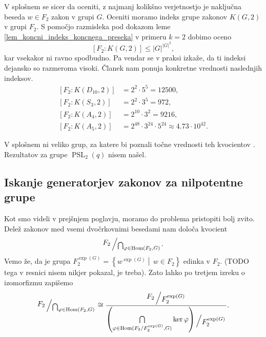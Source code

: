 V splošnem se sicer da oceniti, z najmanj kolikšno verjetnostjo je naključna beseda $w \in F_2$ zakon v grupi $G$.
Oceniti moramo indeks grupe zakonov $K(G, 2)$ v grupi $F_2$. S pomočjo razmisleka pod dokazom leme \ref{lem_koncni_indeks_koncnega_preseka} v primeru $k  = 2$ dobimo oceno
\begin{equation*}
    \left[ F_2 : K(G, 2) \right] \le {\lvert G \rvert}^{{\lvert G \rvert}^2},
    \end{equation*}  
kar vsekakor ni ravno spodbudno. Pa vendar se v praksi izkaže, da ti indeksi dejansko so razmeroma visoki. Članek \cite{Cocke_2020} nam ponuja konkretne vrednosti naslednjih indeksov.
\begin{align*}
    \left[ F_2 : K(D_{10}, 2) \right] &= 2^2 \cdot 5^{5} = 12500, \\
    \left[ F_2 : K(S_3, 2) \right] &= 2^2 \cdot 3^{5} = 972, \\
    \left[ F_2 : K(A_4, 2) \right] &= 2^{10} \cdot  3^{2} = 9216, \\
    \left[ F_2 : K(A_5, 2) \right] &= 2^{48} \cdot  3^{24} \cdot 5^{24} \approx 4.73 \cdot 10^{42}.   %
\end{align*}

V splošnem ni veliko grup, za katere bi poznali točne vrednosti teh kvocientov \cite[str.~1]{Cocke_2020}. Rezultatov za grupe $\operatorname{PSL}_2(q)$ nisem našel.

\subsection{Iskanje generatorjev zakonov za nilpotentne grupe}

Kot smo videli v prejšnjem poglavju, moramo do problema pristopiti bolj zvito. Delež zakonov med vsemi dvočrkovnimi besedami nam določa kvocient \begin{equation*}
\bigslant{F_2}{\bigcap_{\varphi \in \operatorname{Hom}(F_2, G)}}.  
\end{equation*}  
Vemo že, da je grupa $F_2^{\exp(G)} = \left\{ w^{\exp(G)}  \middle|\, w \in F_2 \right\}$ edinka v $F_2$. (TODO tega v resnici nisem nikjer pokazal, je treba).
Zato lahko po tretjem izreku o izomorfizmu zapišemo 
\begin{equation*}
    \bigslant{F_2}{\bigcap_{\varphi \in \operatorname{Hom}(F_2, G)}} \cong \dfrac{\bigslant{F_2}{F_2^{\exp(G)}}}{\bigslant{ \left( \bigcap\limits_{\varphi \in \operatorname{Hom}({F_2} / {F_2^{\exp(G)}}, G)} \ker \varphi \right) }{F_2^{\exp(G)}}}.
\end{equation*}  
  
